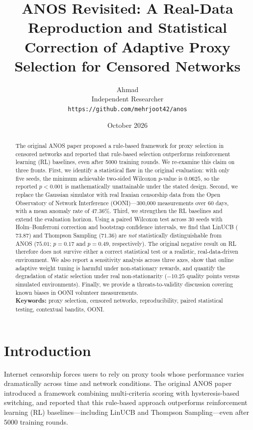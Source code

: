 \documentclass[11pt,a4paper]{article}
\title{\textbf{ANOS Revisited: A Real-Data Reproduction and Statistical
Correction of Adaptive Proxy Selection for Censored Networks}}
\author{
  Ahmad \\
  \small Independent Researcher \\
  \small \texttt{https://github.com/mehrjoot42/anos}
}
\date{October 2026}
\begin{document}
\maketitle

\begin{abstract}
\noindent
The original ANOS paper proposed a rule-based framework for proxy
selection in censored networks and reported that rule-based selection
outperforms reinforcement learning (RL) baselines, even after 5000
training rounds. We re-examine this claim on three fronts.
First, we identify a statistical flaw in the original evaluation:
with only five seeds, the minimum achievable two-sided Wilcoxon
$p$-value is $0.0625$, so the reported $p < 0.001$ is mathematically
unattainable under the stated design. Second, we replace the
Gaussian simulator with real Iranian censorship data from the Open
Observatory of Network Interference (OONI)---300{,}000 measurements
over 60 days, with a mean anomaly rate of $47.36\%$. Third, we
strengthen the RL baselines and extend the evaluation horizon. Using
a paired Wilcoxon test across 30 seeds with Holm--Bonferroni
correction and bootstrap confidence intervals, we find that LinUCB
($73.87$) and Thompson Sampling ($71.36$) are \emph{not} statistically
distinguishable from ANOS ($75.01$; $p = 0.17$ and $p = 0.49$,
respectively). The original negative result on RL therefore does
not survive either a correct statistical test or a realistic,
real-data-driven environment. We also report a sensitivity analysis
across three axes, show that online adaptive weight tuning is
harmful under non-stationary rewards, and quantify the degradation
of static selection under real non-stationarity ($-10.25$ quality
points versus simulated environments). Finally, we provide a
threats-to-validity discussion covering known biases in OONI
volunteer measurements.\\[4pt]
\textbf{Keywords:} proxy selection, censored networks, reproducibility,
paired statistical testing, contextual bandits, OONI.
\end{abstract}

\section{Introduction}
\label{sec:intro}

Internet censorship forces users to rely on proxy tools whose
performance varies dramatically across time and network conditions.
The original ANOS paper introduced a framework combining
multi-criteria scoring with hysteresis-based switching, and reported
that this rule-based approach outperforms reinforcement learning (RL)
baselines---including LinUCB and Thompson Sampling---even after 5000
training rounds.
\end{document}
